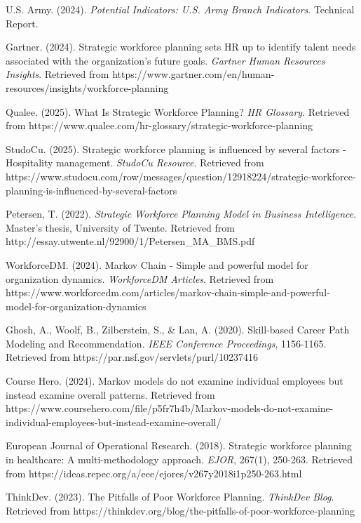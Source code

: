 \documentclass[main.tex]{subfiles}
\begin{document}
\begin{thebibliography}{99}

U.S. Army. (2024). \textit{Potential Indicators: U.S. Army Branch Indicators}. Technical Report.

Gartner. (2024). Strategic workforce planning sets HR up to identify talent needs associated with the organization's future goals. \textit{Gartner Human Resources Insights}. Retrieved from https://www.gartner.com/en/human-resources/insights/workforce-planning

Qualee. (2025). What Is Strategic Workforce Planning? \textit{HR Glossary}. Retrieved from https://www.qualee.com/hr-glossary/strategic-workforce-planning

StudoCu. (2025). Strategic workforce planning is influenced by several factors - Hospitality management. \textit{StudoCu Resource}. Retrieved from https://www.studocu.com/row/messages/question/12918224/strategic-workforce-planning-is-influenced-by-several-factors

Petersen, T. (2022). \textit{Strategic Workforce Planning Model in Business Intelligence}. Master's thesis, University of Twente. Retrieved from http://essay.utwente.nl/92900/1/Petersen\_MA\_BMS.pdf

WorkforceDM. (2024). Markov Chain - Simple and powerful model for organization dynamics. \textit{WorkforceDM Articles}. Retrieved from https://www.workforcedm.com/articles/markov-chain-simple-and-powerful-model-for-organization-dynamics

Ghosh, A., Woolf, B., Zilberstein, S., \& Lan, A. (2020). Skill-based Career Path Modeling and Recommendation. \textit{IEEE Conference Proceedings}, 1156-1165. Retrieved from https://par.nsf.gov/servlets/purl/10237416

Course Hero. (2024). Markov models do not examine individual employees but instead examine overall patterns. Retrieved from https://www.coursehero.com/file/p5fr7h4b/Markov-models-do-not-examine-individual-employees-but-instead-examine-overall/

European Journal of Operational Research. (2018). Strategic workforce planning in healthcare: A multi-methodology approach. \textit{EJOR}, 267(1), 250-263. Retrieved from https://ideas.repec.org/a/eee/ejores/v267y2018i1p250-263.html

ThinkDev. (2023). The Pitfalls of Poor Workforce Planning. \textit{ThinkDev Blog}. Retrieved from https://thinkdev.org/blog/the-pitfalls-of-poor-workforce-planning


\end{thebibliography}
\end{document}

